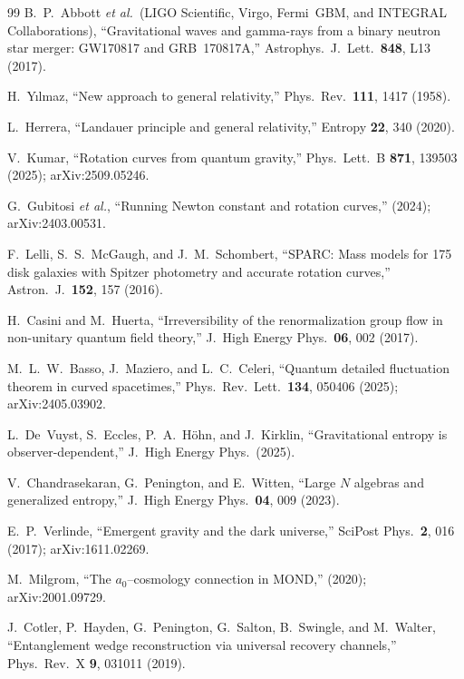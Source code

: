\documentclass[prd,twocolumn,superscriptaddress,longbibliography,floatfix]{revtex4-2}
\begin{document}
\begin{thebibliography}{99}
B.~P.~Abbott \textit{et al.}\ (LIGO Scientific,
Virgo, Fermi~GBM, and INTEGRAL Collaborations),
``Gravitational waves and gamma-rays from a binary
neutron star merger: GW170817 and GRB~170817A,''
Astrophys.\ J.\ Lett.\ \textbf{848}, L13 (2017).

H.~Y\i lmaz,
``New approach to general relativity,''
Phys.\ Rev.\ \textbf{111}, 1417 (1958).

L.~Herrera,
``Landauer principle and general relativity,''
Entropy \textbf{22}, 340 (2020).

V.~Kumar,
``Rotation curves from quantum gravity,''
Phys.\ Lett.\ B \textbf{871}, 139503 (2025);
arXiv:2509.05246.

G.~Gubitosi \textit{et al.},
``Running Newton constant and rotation curves,''
(2024); arXiv:2403.00531.

F.~Lelli, S.~S.~McGaugh, and J.~M.~Schombert,
``SPARC: Mass models for 175 disk galaxies with
Spitzer photometry and accurate rotation curves,''
Astron.\ J.\ \textbf{152}, 157 (2016).

H.~Casini and M.~Huerta,
``Irreversibility of the renormalization group flow
in non-unitary quantum field theory,''
J.\ High Energy Phys.\ \textbf{06}, 002 (2017).

M.~L.~W.~Basso, J.~Maziero, and L.~C.~Celeri,
``Quantum detailed fluctuation theorem in curved
spacetimes,''
Phys.\ Rev.\ Lett.\ \textbf{134}, 050406 (2025);
arXiv:2405.03902.

L.~De~Vuyst, S.~Eccles, P.~A.~H\"ohn, and
J.~Kirklin,
``Gravitational entropy is observer-dependent,''
J.\ High Energy Phys.\ (2025).

V.~Chandrasekaran, G.~Penington, and E.~Witten,
``Large $N$ algebras and generalized entropy,''
J.\ High Energy Phys.\ \textbf{04}, 009 (2023).

E.~P.~Verlinde,
``Emergent gravity and the dark universe,''
SciPost Phys.\ \textbf{2}, 016 (2017);
arXiv:1611.02269.

M.~Milgrom,
``The $a_0$--cosmology connection in MOND,''
(2020); arXiv:2001.09729.

J.~Cotler, P.~Hayden, G.~Penington, G.~Salton,
B.~Swingle, and M.~Walter,
``Entanglement wedge reconstruction via universal
recovery channels,''
Phys.\ Rev.\ X \textbf{9}, 031011 (2019).


\end{thebibliography}
\end{document}
